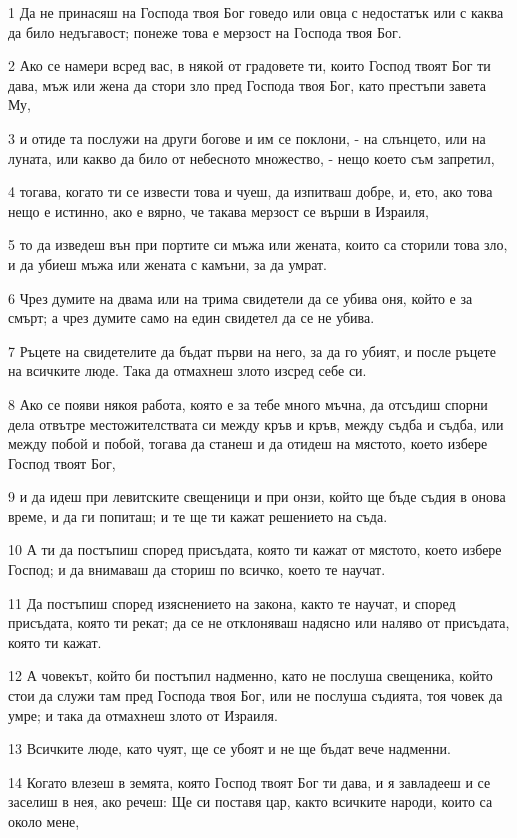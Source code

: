 \par 1 Да не принасяш на Господа твоя Бог говедо или овца с недостатък или с каква да било недъгавост; понеже това е мерзост на Господа твоя Бог.
\par 2 Ако се намери всред вас, в някой от градовете ти, които Господ твоят Бог ти дава, мъж или жена да стори зло пред Господа твоя Бог, като престъпи завета Му,
\par 3 и отиде та послужи на други богове и им се поклони, - на слънцето, или на луната, или какво да било от небесното множество, - нещо което съм запретил,
\par 4 тогава, когато ти се извести това и чуеш, да изпитваш добре, и, ето, ако това нещо е истинно, ако е вярно, че такава мерзост се върши в Израиля,
\par 5 то да изведеш вън при портите си мъжа или жената, които са сторили това зло, и да убиеш мъжа или жената с камъни, за да умрат.
\par 6 Чрез думите на двама или на трима свидетели да се убива оня, който е за смърт; а чрез думите само на един свидетел да се не убива.
\par 7 Ръцете на свидетелите да бъдат първи на него, за да го убият, и после ръцете на всичките люде. Така да отмахнеш злото изсред себе си.
\par 8 Ако се появи някоя работа, която е за тебе много мъчна, да отсъдиш спорни дела отвътре местожителствата си между кръв и кръв, между съдба и съдба, или между побой и побой, тогава да станеш и да отидеш на мястото, което избере Господ твоят Бог,
\par 9 и да идеш при левитските свещеници и при онзи, който ще бъде съдия в онова време, и да ги попиташ; и те ще ти кажат решението на съда.
\par 10 А ти да постъпиш според присъдата, която ти кажат от мястото, което избере Господ; и да внимаваш да сториш по всичко, което те научат.
\par 11 Да постъпиш според изяснението на закона, както те научат, и според присъдата, която ти рекат; да се не отклоняваш надясно или наляво от присъдата, която ти кажат.
\par 12 А човекът, който би постъпил надменно, като не послуша свещеника, който стои да служи там пред Господа твоя Бог, или не послуша съдията, тоя човек да умре; и така да отмахнеш злото от Израиля.
\par 13 Всичките люде, като чуят, ще се убоят и не ще бъдат вече надменни.
\par 14 Когато влезеш в земята, която Господ твоят Бог ти дава, и я завладееш и се заселиш в нея, ако речеш: Ще си поставя цар, както всичките народи, които са около мене,

